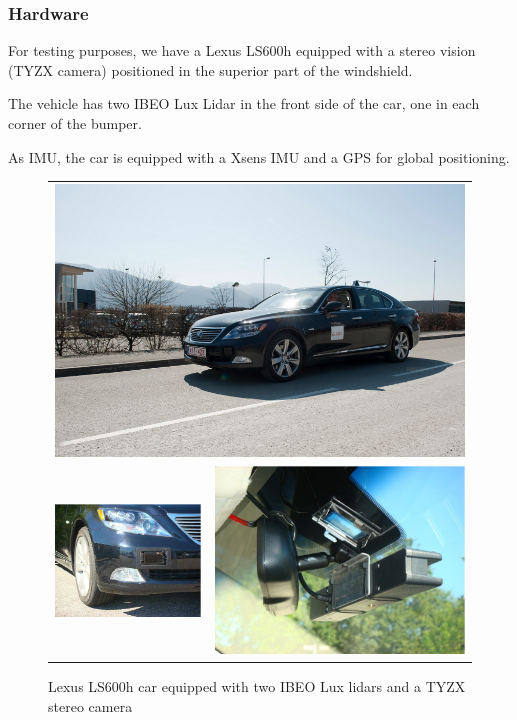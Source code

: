 \subsubsection*{Hardware}

For testing purposes, we have a Lexus LS600h equipped with a stereo vision (TYZX camera) positioned in the superior part of the windshield.

The vehicle has two IBEO Lux Lidar in the front side of the car, one in each corner of the bumper.

As IMU, the car is equipped with a Xsens IMU and a GPS for global positioning.

\begin{figure}[h]
   \centering
     \begin{tabular}{lr}
     \multicolumn{2}{c}{ \includegraphics[width=0.55\columnwidth]{img/testbed:car}}\\
       \includegraphics[width=0.40\columnwidth]{img/testbed:ibeo}
       &\includegraphics[width=0.40\columnwidth]{img/testbed:tyzx}
     \end{tabular}
   \caption{Lexus LS600h car equipped with two IBEO Lux lidars and a TYZX
     stereo camera}
   \label{fig:Lexus}
 \end{figure}


